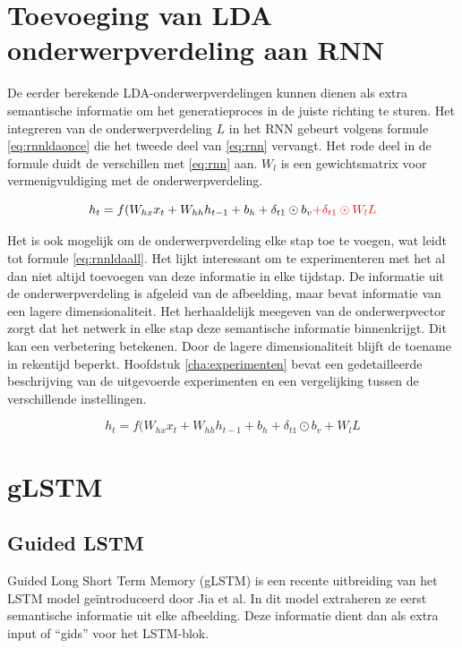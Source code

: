 \section{Toevoeging van LDA onderwerpverdeling aan RNN}
De eerder berekende LDA-onderwerpverdelingen kunnen dienen als extra semantische informatie om het generatieproces in de juiste richting te sturen. Het integreren van de onderwerpverdeling $L$ in het RNN gebeurt volgens formule \eqref{eq:rnnldaonce} die het tweede deel van \eqref{eq:rnn} vervangt. Het rode deel in de formule duidt de verschillen met \eqref{eq:rnn} aan. $W_l$ is een gewichtsmatrix voor vermenigvuldiging met de onderwerpverdeling.

\begin{equation}
    h_t = f(W_{hx} x_{t} + W_{hh} h_{t-1} + b_h + \delta_{t1} \odot b_v \color{red}{+\delta_{t1} \odot W_lL}
    \color{black}
    \label{eq:rnnldaonce}
\end{equation}

Het is ook mogelijk om de onderwerpverdeling elke stap toe te voegen, wat leidt tot formule \eqref{eq:rnnldaall}. Het lijkt interessant om te experimenteren met het al dan niet altijd toevoegen van deze informatie in elke tijdstap. De informatie uit de onderwerpverdeling is afgeleid van de afbeelding, maar bevat informatie van een lagere dimensionaliteit. Het herhaaldelijk meegeven van de onderwerpvector zorgt dat het netwerk in elke stap deze semantische informatie binnenkrijgt. Dit kan een verbetering betekenen. Door de lagere dimensionaliteit blijft de toename in rekentijd beperkt. Hoofdstuk \ref{cha:experimenten} bevat een gedetailleerde beschrijving van de uitgevoerde experimenten en een vergelijking tussen de verschillende instellingen.

\begin{equation}
    h_t = f(W_{hx} x_{t} + W_{hh} h_{t-1} + b_h + \delta_{t1} \odot b_v + W_lL
    \label{eq:rnnldaall}
\end{equation}


\section{gLSTM}
\subsection{Guided LSTM}
Guided Long Short Term Memory (gLSTM) is een recente uitbreiding van het LSTM model ge\"introduceerd door Jia et al.\cite{Fernando2015} In dit model extraheren ze eerst semantische informatie uit elke afbeelding. Deze informatie dient dan als extra input of ``gids'' voor het LSTM-blok.

